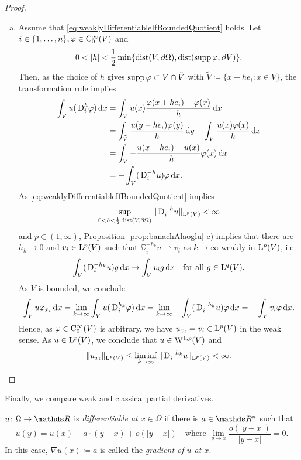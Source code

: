 \begin{proof}
\begin{enumerate}[a)]
    \item Assume that \eqref{eq:weaklyDifferentiableIfBoundedQuotient} holds.
      Let $i \in \{1,\dots,n\}, \varphi \in \mathrm{C}_0^\infty(V)$ and 
      $$
      0 < |h| < \frac{1}{2} \min\{ \operatorname{dist}(V,\partial\Omega), \operatorname{dist}(\operatorname{supp} \varphi, \partial V)\}.$$
      Then, as the choice of $h$ gives $\operatorname{supp} \varphi \subset V \cap \tilde V$ with $\tilde V \coloneqq \{ x + he_i \colon x \in V \}$, the transformation rule implies
      \begin{align*}
        \int_V u(\,{\operatorname{D}}_i^h \varphi)\, {\operatorname{d}\!{x}}
        &= \int_V u(x) \frac{\varphi(x + he_i) - \varphi(x)}{h} \, {\operatorname{d}\!{x}} \\
        &= \int_{\tilde V} \frac{u(y - h e_i)\varphi(y)}{h} \, {\operatorname{d}\!{y}} - \int_V \frac{u(x) \varphi(x)}{h} \, {\operatorname{d}\!{x}} \\
        &= \int_V - \frac{u(x - he_i) - u(x)}{-h} \varphi(x) \, {\operatorname{d}\!{x}} \\
        &= - \int_V (\,{\operatorname{D}}_i^{-h} u) \varphi \, {\operatorname{d}\!{x}}.
      \end{align*}
      As \eqref{eq:weaklyDifferentiableIfBoundedQuotient} implies
      $$
      \sup_{0 < h < \frac{1}{2} \operatorname{dist}(V, \partial\Omega)} \|\,{\operatorname{D}}_i^{-h} u\|_{\mathrm{L}^p(V)} < \infty
      $$
      and $p \in (1,\infty)$, Proposition \ref{prop:banachAlaoglu} c) implies that there are $h_k \to 0$ and $v_i \in \mathrm{L}^p(V)$ such that $\DD_i^{-h_k} u \rightharpoonup v_i$ as $k \to \infty$ weakly in $\mathrm{L}^p(V)$, i.e.
      \begin{equation}
        \label{eq:weakConvergenceInLp}
        \int_V (\,{\operatorname{D}}_i^{-h_k} u) g \, {\operatorname{d}\!{x}} \to \int_V v_i g \, {\operatorname{d}\!{x}} \quad\text{for all } g \in \mathrm{L}^q(V).
      \end{equation}
      As $V$ is bounded, we conclude
      $$
        \int_V u \varphi_{x_i} \, {\operatorname{d}\!{x}}
        = \lim_{k \to \infty} \int_V u( \,{\operatorname{D}}_i^{h_k} \varphi ) \, {\operatorname{d}\!{x}}
        = \lim_{k \to \infty} - \int_V ( \,{\operatorname{D}}_i^{-h_k} u) \varphi \, {\operatorname{d}\!{x}}
        = - \int_V v_i \varphi \, {\operatorname{d}\!{x}}.
      $$
      Hence, as $\varphi \in \mathrm{C}_0^\infty(V)$ is arbitrary, we have $u_{x_i} = v_i \in \mathrm{L}^p(V)$ in the weak sense.
      As $u \in \mathrm{L}^p(V)$, we conclude that $u \in \mathrm{W}^{1,p}(V)$ and
      \[
      \|u_{x_i}\|_{\mathrm{L}^p(V)} \leq \liminf_{k \to \infty} \|\,{\operatorname{D}}_i^{-h_k} u \|_{\mathrm{L}^p(V)} < \infty. \qedhere
    \]
  \end{enumerate}
\end{proof}

Finally, we compare weak and classical partial derivatives.

\begin{defn}
  $u \colon \Omega \to \R$ is \emph{differentiable at $x \in \Omega$} if there is $a \in \R^n$ such that 
  $$
  u(y) = u(x) + a \cdot (y - x) + o(|y - x|) \quad\text{where } \lim_{y \to x} \frac{o(|y - x|)}{|y - x|} = 0.
  $$
  In this case, $\nabla u(x) \coloneqq a$ is called the \emph{gradient of $u$ at $x$}.
\end{defn}


